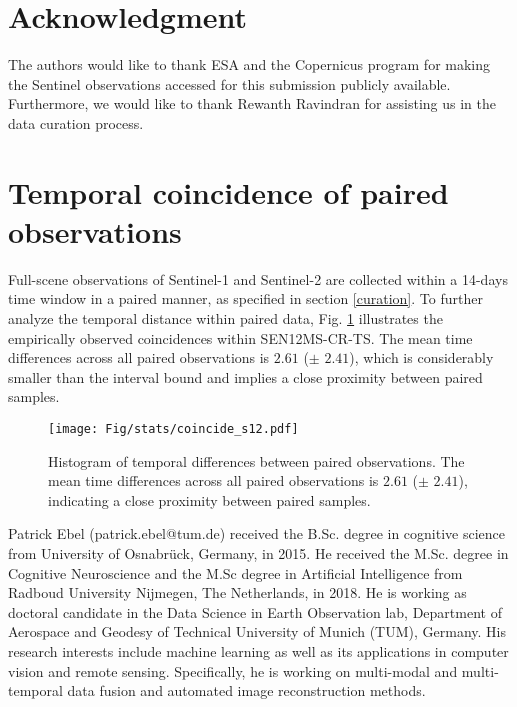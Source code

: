 \documentclass[journal]{IEEEtran}
\begin{document}
\section*{Acknowledgment}


The authors would like to thank ESA and the Copernicus program for making the Sentinel observations accessed for this submission publicly available. Furthermore, we would like to thank Rewanth Ravindran for assisting us in the data curation process. 


\ifCLASSOPTIONcaptionsoff
  \newpage
\fi

\appendices

\section{Temporal coincidence of paired observations} \label{appendix:a}

Full-scene observations of Sentinel-1 and Sentinel-2 are collected within a 14-days time window in a paired manner, as specified in section \ref{curation}. To further analyze the temporal distance within paired data, Fig. \ref{fig:temp_coincidence} illustrates the empirically observed coincidences within SEN12MS-CR-TS. The mean time differences across all paired observations is $2.61$ ($\pm$ $2.41$), which is considerably smaller than the interval bound and implies a close proximity between paired samples.

\begin{figure}[h!tb] \texttt{[image: Fig/stats/coincide\_s12.pdf]}
    \caption{Histogram of temporal differences between paired observations. The mean time differences across all paired observations is $2.61$ ($\pm$ $2.41$), indicating a close proximity between paired samples.}
    \label{fig:temp_coincidence}
\end{figure}

















\begin{IEEEbiography}{Patrick Ebel} (patrick.ebel@tum.de) received the B.Sc. degree in cognitive science from University of Osnabrück, Germany, in 2015. He received the M.Sc. degree in Cognitive Neuroscience and the M.Sc degree in Artificial Intelligence from Radboud University Nijmegen, The Netherlands, in 2018. He is working as doctoral candidate in the Data Science in Earth Observation lab, Department of Aerospace and Geodesy of Technical University of Munich (TUM), Germany. His research interests include machine learning as well as its applications in computer vision and remote sensing. Specifically, he is working on multi-modal and multi-temporal data fusion and automated image reconstruction methods. \end{IEEEbiography}
\end{document}
